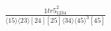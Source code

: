 \documentclass[varwidth, border=5pt]{standalone}
\begin{document}
\begin{my}
$\begin{gathered}
\scriptscriptstyle\frac{1tr5_{1234}^2}{⟨15⟩⟨23⟩[24][25]⟨34⟩⟨45⟩^3[45]}
\end{gathered}$
\end{my}
\end{document}
